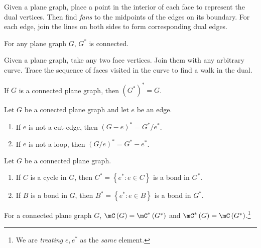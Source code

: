 \documentclass[co342]{subfiles}
\begin{document}
    Given a plane graph, place a point in the interior of each face to represent the dual vertices. Then find \textit{fans} to the midpoints of the edges on its boundary. For each edge, join the lines on both sides to form corresponding dual edges.
    
    \clearpage
    \begin{prop}{}
        For any plane graph $G$, $G^{*}$ is connected.
    \end{prop}

    Given a plane graph, take any two face vertices. Join them with any arbitrary curve. Trace the sequence of faces visited in the curve to find a walk in the dual.

    \begin{cor}{}
        If $G$ is a connected plane graph, then $\left( G^{*} \right)^{*}=G$.
    \end{cor}	
    
    \begin{prop}{}
        Let $G$ be a conected plane graph and let $e$ be an edge. 
        \begin{enumerate}
            \item If $e$ is not a cut-edge, then $\left( G-e \right)^{*} = G^{*} /e^{*}$.
            \item If $e$ is not a loop, then $\left( G /e \right)^{*} = G^{*}-e^{*}$.
        \end{enumerate}
    \end{prop}
    
    \begin{prop}{}
        Let $G$ be a connected plane graph.
        \begin{enumerate}
            \item If $C$ is a cycle in $G$, then $C^{*}=\left\lbrace e^{*}:e\in C \right\rbrace$ is a bond in $G^{*}$.
            \item If $B$ is a bond in $G$, then $B^{*}=\left\lbrace e^{*}:e\in B \right\rbrace$ is a bond in $G^{*}$.
        \end{enumerate}
    \end{prop}
    
    \begin{cor}{}
        For a connected plane graph $G$, $\mC\left( G \right)=\mC^{*}\left( G^{*} \right)$ and $\mC^{*}\left( G \right)=\mC\left( G^{*} \right)$.\footnote{We are \textit{treating} $e,e^{*}$ as the \textit{same} element.}
    \end{cor}	
\end{document}

